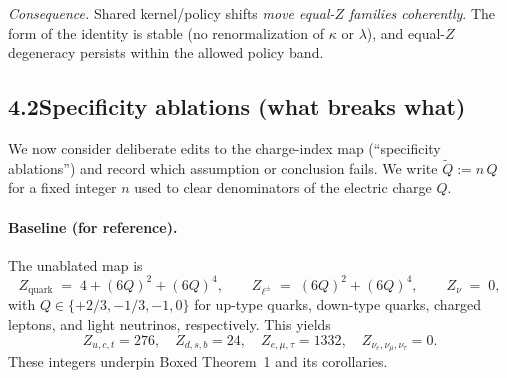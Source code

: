 \documentclass[11pt]{article}
\begin{document}
\medskip
\noindent\textit{Consequence.} Shared kernel/policy shifts \emph{move equal-$Z$ families coherently}. The form of the identity is stable (no renormalization of $\kappa$ or $\lambda$), and equal-$Z$ degeneracy persists within the allowed policy band.

\subsection*{4.2\quad Specificity ablations (what breaks what)}

We now consider deliberate edits to the charge-index map (``specificity ablations'') and record which assumption or conclusion fails. We write $\tilde Q:=n\,Q$ for a fixed integer $n$ used to clear denominators of the electric charge $Q$.

\paragraph{Baseline (for reference).}
The unablated map is
\[
Z_{\text{quark}} \;=\; 4 + (6Q)^2 + (6Q)^4,
\qquad
Z_{\ell^\pm} \;=\; (6Q)^2 + (6Q)^4,
\qquad
Z_{\nu} \;=\; 0,
\]
with $Q\in\{+2/3,-1/3,-1,0\}$ for up-type quarks, down-type quarks, charged leptons, and light neutrinos, respectively. This yields
\[
Z_{u,c,t}=276, \quad Z_{d,s,b}=24,\quad Z_{e,\mu,\tau}=1332,\quad Z_{\nu_e,\nu_\mu,\nu_\tau}=0.
\]
These integers underpin Boxed Theorem~1 and its corollaries.

\medskip
\setlength{\fboxrule}{0.5pt}
\setlength{\fboxsep}{6pt}


\medskip
\end{document}

